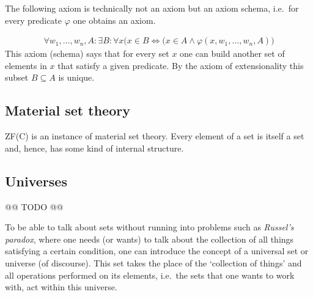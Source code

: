     The following axiom is technically not an axiom but an axiom schema, i.e.~for every predicate $\varphi$ one obtains an axiom.
    \begin{axiom}[Specification]
        \begin{gather}
            \forall w_1,\ldots,w_n,A:\exists B:\forall x\bigl(x\in B\iff(x\in A\land\varphi(x,w_1,\ldots,w_n,A)\bigr)
        \end{gather}
        This axiom (schema) says that for every set $x$ one can build another set of elements in $x$ that satisfy a given predicate. By the axiom of extensionality this subset $B\subseteq A$ is unique.
    \end{axiom}

\subsection{Material set theory}

    ZF(C) is an instance of material set theory. Every element of a set is itself a set and, hence, has some kind of internal structure.


\subsection{Universes}\label{section:universes}

    @@ TODO @@

    To be able to talk about sets without running into problems such as \textit{Russel's paradox}, where one needs (or wants) to talk about the collection of all things satisfying a certain condition, one can introduce the concept of a universal set or universe (of discourse). This set takes the place of the `collection of things' and all operations performed on its elements, i.e.~the sets that one wants to work with, act within this universe.


